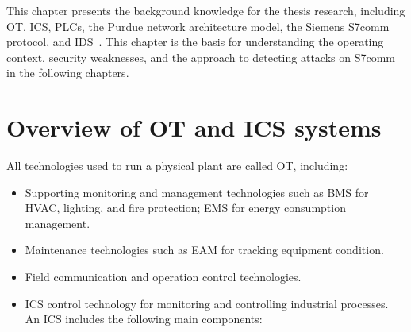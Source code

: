 \documentclass[../main.tex]{subfiles}
\begin{document}
This chapter presents the background knowledge for the thesis research, including OT, ICS, PLCs, the Purdue network architecture model, the Siemens S7comm protocol, and IDS~\cite{nist_sp800_82}. This chapter is the basis for understanding the operating context, security weaknesses, and the approach to detecting attacks on S7comm in the following chapters.

\section{Overview of OT and ICS systems}
\label{sec:ot-ics}

All technologies used to run a physical plant are called OT, including:

\begin{itemize}
    \item Supporting monitoring and management technologies such as BMS for HVAC, lighting, and fire protection; EMS for energy consumption management.
    \item Maintenance technologies such as EAM for tracking equipment condition.
    \item Field communication and operation control technologies.
    \item ICS control technology for monitoring and controlling industrial processes. An ICS includes the following main components:
\end{itemize}

\begin{center}
    \end{center}
\end{document}
